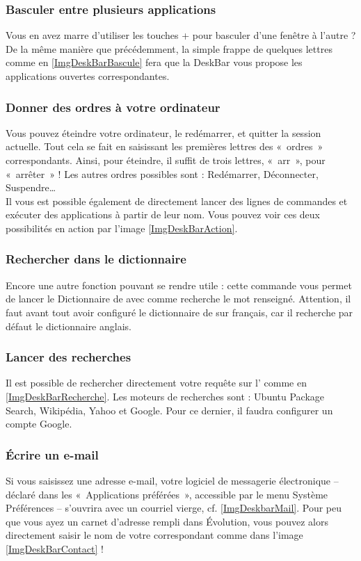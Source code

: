\subsubsection{Basculer entre plusieurs applications}
Vous en avez marre d'utiliser les touches  +  pour basculer d'une fenêtre à l'autre ? De la même manière que précédemment, la simple frappe de quelques lettres comme en \ref{ImgDeskBarBascule} fera que la DeskBar vous propose les applications ouvertes correspondantes.
\subsubsection{Donner des ordres à votre ordinateur}
Vous pouvez éteindre votre ordinateur, le redémarrer, et quitter la session actuelle. Tout cela se fait en saisissant les premières lettres des «~ordres~» correspondants. Ainsi, pour éteindre, il suffit de trois lettres, «~arr~», pour «~arrêter~» ! Les autres ordres possibles sont : Redémarrer, Déconnecter, Suspendre\ldots{}\\
Il vous est possible également de directement lancer des lignes de commandes et exécuter des applications à partir de leur nom. Vous pouvez voir ces deux possibilités en action par l'image \ref{ImgDeskBarAction}.
\DeskBarPartieUn
\afterpage{\clearpage}%
\subsubsection{Rechercher dans le dictionnaire}
Encore une autre fonction pouvant se rendre utile : cette commande vous permet de lancer le Dictionnaire de  avec comme recherche le mot renseigné. Attention, il faut avant tout avoir configuré le dictionnaire de  sur français, car il recherche par défaut le dictionnaire anglais.
\subsubsection{Lancer des recherches}
Il est possible de rechercher directement votre requête sur l' comme en \ref{ImgDeskBarRecherche}. Les moteurs de recherches sont : Ubuntu Package Search, Wikipédia, Yahoo et Google. Pour ce dernier, il faudra configurer un compte Google.
\subsubsection{Écrire un e-mail}
Si vous saisissez une adresse e-mail, votre logiciel de messagerie électronique -- déclaré dans les «~Applications préférées~», accessible par le menu Système \FlecheDroite Préférences -- s'ouvrira avec un courriel vierge, cf. \ref{ImgDeskbarMail}.
Pour peu que vous ayez un carnet d'adresse rempli dans Évolution, vous pouvez alors directement saisir le nom de votre correspondant comme dans l'image \ref{ImgDeskBarContact} !
